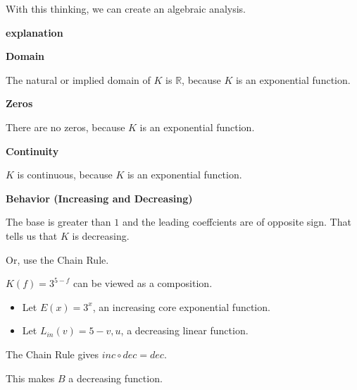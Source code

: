 \documentclass{ximera}
\begin{document}
\begin{example}
\begin{image}
\end{image}



With this thinking, we can create an algebraic analysis. 

\textbf{\textcolor{red!75!green}{explanation}}



\textbf{Domain}

The natural or implied domain of $K$ is $\mathbb{R}$, because $K$ is an exponential function. 


\textbf{Zeros}

There are no zeros, because $K$ is an exponential function. 




\textbf{Continuity}

$K$ is continuous, because $K$ is an exponential function. 




\textbf{Behavior (Increasing and Decreasing)}


The base is greater than $1$ and the leading coeffcients are of opposite sign.  That tells us that $K$ is decreasing.

Or, use the Chain Rule.

$K(f) = 3^{5-f}$ can be viewed as a composition.




\begin{itemize}
\item Let $E(x) = 3^x$, an increasing core exponential function.
\item Let $L_{in}(v) = 5-v,u$, a decreasing linear function.
\end{itemize}


The Chain Rule gives $inc \circ dec = dec$.


This makes $B$ a decreasing function. 

















\end{example}
\end{document}
